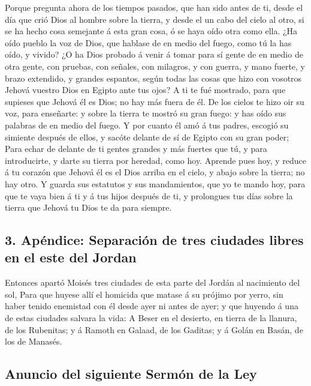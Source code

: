  Porque pregunta ahora de los tiempos pasados, que han
sido antes de ti, desde el día que crió Dios al hombre sobre la tierra,
y desde el un cabo del cielo al otro, si se ha hecho cosa semejante á
esta gran cosa, ó se haya oído otra como ella.  ¿Ha oído
pueblo la voz de Dios, que hablase de en medio del fuego, como tú la has
oído, y vivido?  ¿O ha Dios probado á venir á tomar para
sí gente de en medio de otra gente, con pruebas, con señales, con
milagros, y con guerra, y mano fuerte, y brazo extendido, y grandes
espantos, según todas las cosas que hizo con vosotros Jehová vuestro
Dios en Egipto ante tus ojos?  A ti te fué mostrado, para
que supieses que Jehová él es Dios; no hay más fuera de él.
 De los cielos te hizo oir su voz, para enseñarte: y
sobre la tierra te mostró su gran fuego: y has oído sus palabras de en
medio del fuego.  Y por cuanto él amó á tus padres,
escogió su simiente después de ellos, y sacóte delante de sí de Egipto
con su gran poder;  Para echar de delante de ti gentes
grandes y más fuertes que tú, y para introducirte, y darte su tierra por
heredad, como hoy.  Aprende pues hoy, y reduce á tu
corazón que Jehová él es el Dios arriba en el cielo, y abajo sobre la
tierra; no hay otro.  Y guarda sus estatutos y sus
mandamientos, que yo te mando hoy, para que te vaya bien á ti y á tus
hijos después de ti, y prolongues tus días sobre la tierra que Jehová tu
Dios te da para siempre.

\hypertarget{apuxe9ndice-separaciuxf3n-de-tres-ciudades-libres-en-el-este-del-jordan}{%
\subsection{3. Apéndice: Separación de tres ciudades libres en el este
del
Jordan}\label{apuxe9ndice-separaciuxf3n-de-tres-ciudades-libres-en-el-este-del-jordan}}

 Entonces apartó Moisés tres ciudades de esta parte del
Jordán al nacimiento del sol,  Para que huyese allí el
homicida que matase á su prójimo por yerro, sin haber tenido enemistad
con él desde ayer ni antes de ayer; y que huyendo á una de estas
ciudades salvara la vida:  A Beser en el desierto, en
tierra de la llanura, de los Rubenitas; y á Ramoth en Galaad, de los
Gaditas; y á Golán en Basán, de los de Manasés.

\hypertarget{anuncio-del-siguiente-sermuxf3n-de-la-ley}{%
\subsection{Anuncio del siguiente Sermón de la
Ley}\label{anuncio-del-siguiente-sermuxf3n-de-la-ley}}


